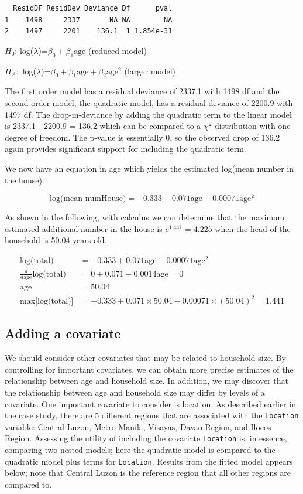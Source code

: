 \documentclass[
]{krantz}
\begin{document}
\begin{verbatim}
  ResidDF ResidDev Deviance Df      pval
1    1498     2337       NA NA        NA
2    1497     2201    136.1  1 1.854e-31
\end{verbatim}

\(H_0\): log(\(\lambda\))=\(\beta_0+\beta_1 \textrm{age}\) (reduced model)

\(H_A:\) log(\(\lambda\))=\(\beta_0+\beta_1 \textrm{age} + \beta_2 \textrm{age}^2\) (larger model)

The first order model has a residual deviance of 2337.1 with 1498 df and the second order model, the quadratic model, has a residual deviance of 2200.9 with 1497 df. The drop-in-deviance by adding the quadratic term to the linear model is 2337.1 - 2200.9 = 136.2 which can be compared to a \(\chi^2\) distribution with one degree of freedom. The p-value is essentially 0, so the observed drop of 136.2 again provides significant support for including the quadratic term.

We now have an equation in age which yields the estimated log(mean number in the house).

\[\textrm{log(mean numHouse)} =  -0.333 + 0.071 \textrm{age} - 0.00071 \textrm{age}^2\]

As shown in the following, with calculus we can determine that the maximum estimated additional number in the house is \(e^{1.441} = 4.225\) when the head of the household is 50.04 years old.

\begin{align*}
\textrm{log(total)} & = -0.333 + 0.071\textrm{age} - 0.00071 \textrm{age}^2 \\
\frac{d}{d\textrm{age}}\textrm{log(total)} & = 0 + 0.071 - 0.0014 \textrm{age} = 0 \\
\textrm{age} & = 50.04 \\
\textrm{max[log(total)]} & = -0.333 + 0.071 \times 50.04 - 0.00071 \times (50.04)^2 = 1.441
\end{align*}

\hypertarget{adding-a-covariate}{%
\subsection{Adding a covariate}\label{adding-a-covariate}}

We should consider other covariates that may be related to household size. By controlling for important covariates, we can obtain more precise estimates of the relationship between age and household size. In addition, we may discover that the relationship between age and household size may differ by levels of a covariate. One important covariate to consider is location. As described earlier in the case study, there are 5 different regions that are associated with the \texttt{Location} variable: Central Luzon, Metro Manila, Visayas, Davao Region, and Ilocos Region. Assessing the utility of including the covariate \texttt{Location} is, in essence, comparing two nested models; here the quadratic model is compared to the quadratic model plus terms for \texttt{Location}. Results from the fitted model appears below; note that Central Luzon is the reference region that all other regions are compared to.
\end{document}
